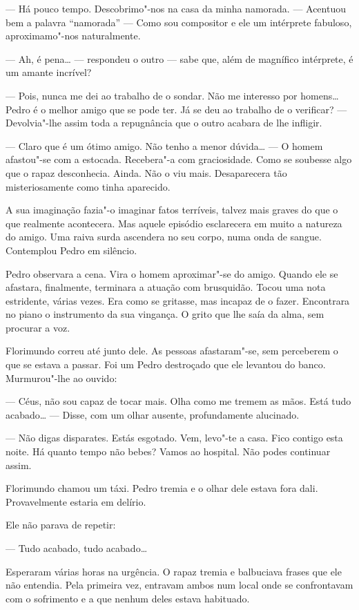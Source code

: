 --- Há pouco tempo. Descobrimo"-nos na casa da minha namorada. --- Acentuou
bem a palavra ``namorada'' --- Como sou compositor e ele um intérprete
fabuloso, aproximamo"-nos naturalmente.

--- Ah, é pena\ldots{} --- respondeu o outro --- sabe que, além de magnífico
intérprete, é um amante incrível?

--- Pois, nunca me dei ao trabalho de o sondar. Não me interesso por
homens\ldots{} Pedro é o melhor amigo que se pode ter. Já se deu ao trabalho
de o verificar? --- Devolvia"-lhe assim toda a repugnância que o outro
acabara de lhe infligir.

--- Claro que é um ótimo amigo. Não tenho a menor dúvida\ldots{} --- O homem
afastou"-se com a estocada. Recebera"-a com graciosidade. Como se soubesse
algo que o rapaz desconhecia. Ainda. Não o viu mais. Desaparecera tão
misteriosamente como tinha aparecido.

A sua imaginação fazia"-o imaginar fatos terríveis, talvez mais graves
do que o que realmente acontecera. Mas aquele episódio esclarecera em
muito a natureza do amigo. Uma raiva surda ascendera no seu corpo, numa
onda de sangue. Contemplou Pedro em silêncio.

Pedro observara a cena. Vira o homem aproximar"-se do amigo. Quando ele
se afastara, finalmente, terminara a atuação com brusquidão. Tocou uma
nota estridente, várias vezes. Era como se gritasse, mas incapaz de o
fazer. Encontrara no piano o instrumento da sua vingança. O grito que
lhe saía da alma, sem procurar a voz.

Florimundo correu até junto dele. As pessoas afastaram"-se, sem
perceberem o que se estava a passar. Foi um Pedro destroçado que ele
levantou do banco. Murmurou"-lhe ao ouvido:

--- Céus, não sou capaz de tocar mais. Olha como me tremem as mãos. Está
tudo acabado\ldots{} --- Disse, com um olhar ausente, profundamente alucinado.

--- Não digas disparates. Estás esgotado. Vem, levo"-te a casa. Fico
contigo esta noite. Há quanto tempo não bebes? Vamos ao hospital. Não
podes continuar assim.

Florimundo chamou um táxi. Pedro tremia e o olhar dele estava fora dali.
Provavelmente estaria em delírio.

Ele não parava de repetir:

--- Tudo acabado, tudo acabado\ldots{}

Esperaram várias horas na urgência. O rapaz tremia e balbuciava frases
que ele não entendia. Pela primeira vez, entravam ambos num local onde
se confrontavam com o sofrimento e a que nenhum deles estava habituado.

